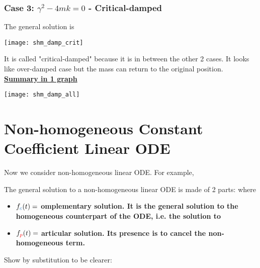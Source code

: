 \documentclass[class=article, crop=false, 12pt]{standalone}
\begin{document}
\subsubsection{Case 3: $\gamma^2-4mk =0$ - Critical-damped}

The general solution is 

\begin{center}
    \texttt{[image: shm\_damp\_crit]}
\end{center}

It is called "critical-damped" because it is in between the other 2 cases.
It looks like over-damped case but the mass can return to the original position.\\

\linesep
\ul{\bf{Summary in 1 graph}}
\begin{center}
    \texttt{[image: shm\_damp\_all]}
\end{center}


\linesep
\section{Non-homogeneous Constant Coefficient Linear ODE}

Now we consider non-homogeneous linear ODE. For example,

The general solution to a non-homogeneous linear ODE is made of 2 parts:
where
\begin{itemize}
    \item $f_\blue{c}(t) =$ \bf{omplementary solution}. 
    It is the general solution to the homogeneous counterpart of the ODE, 
    i.e. the solution to

    \item $f_{\color{red}{p}}(t) =$ \bf{articular solution}. 
    Its presence is to cancel the non-homogeneous term. 
\end{itemize}

Show by substitution to be clearer:
\end{document}
